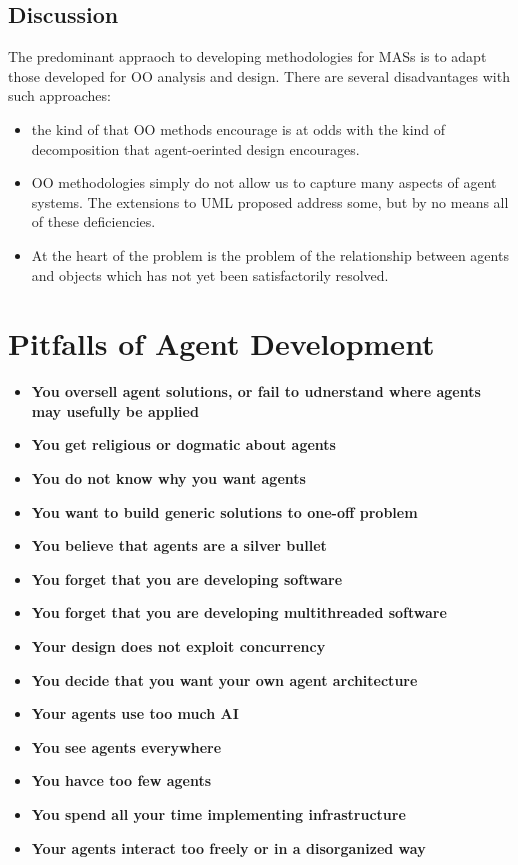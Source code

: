\subsection{Discussion}
The predominant appraoch to developing methodologies for MASs is to adapt those developed for OO analysis and design.
There are several disadvantages with such approaches:
\begin{itemize}
\item the kind of  that OO methods encourage is at odds with the kind of decomposition that agent-oerinted design encourages.
\item OO methodologies simply do not allow us to capture many aspects of agent systems. The extensions to UML proposed address some, but by no means all of these deficiencies.
\item At the heart of the problem is the problem of the relationship between  agents and objects which has not yet been satisfactorily resolved.
\end{itemize}

\section{Pitfalls of Agent Development}

\begin{itemize}
\item \textbf{You oversell agent solutions, or fail to udnerstand where agents may usefully be applied}
\item \textbf{You get religious or dogmatic about agents}
\item \textbf{You do not know why you want agents}
\item \textbf{You want to build generic solutions to one-off problem}
\item \textbf{You believe that agents are a silver bullet}
\item \textbf{You forget that you are developing software}
\item \textbf{You forget that you are developing multithreaded software}
\item \textbf{Your design does not exploit concurrency}
\item \textbf{You decide that you want your own agent architecture}
\item \textbf{Your agents use too much AI}
\item \textbf{You see agents everywhere}
\item \textbf{You havce too few agents}
\item \textbf{You spend all your time implementing infrastructure}
\item \textbf{Your agents interact too freely or in a disorganized way}
\end{itemize}
